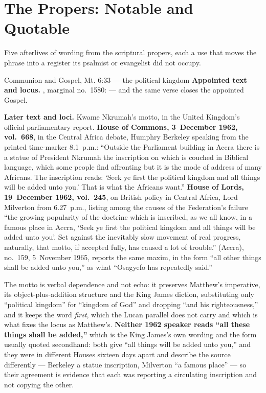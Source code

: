 \sectionguard
\section*{The Propers: Notable and Quotable}

Five afterlives of wording from the scriptural propers, each a use that moves
the phrase into a register its psalmist or evangelist did not occupy.

\begin{afterlife}{Communion and Gospel, Mt. 6:33 --- the political kingdom}
\textbf{Appointed text and locus.} , marginal
no.~1580:  --- and the same verse closes the appointed Gospel.

\textbf{Later text and loci.} Kwame Nkrumah's motto, in the United Kingdom's
official parliamentary report. \textbf{House of Commons, 3~December 1962,
vol.~668}, in the Central Africa debate, Humphry Berkeley speaking from the
printed time-marker 8.1~p.m.: ``Outside the Parliament building in Accra there
is a statue of President Nkrumah the inscription on which is couched in Biblical
language, which some people find affronting but it is the mode of address of
many Africans. The inscription reads: `Seek ye first the political kingdom and
all things will be added unto you.' That is what the Africans want.''
\textbf{House of Lords, 19~December 1962, vol.~245}, on British policy in
Central Africa, Lord Milverton from 6.27~p.m., listing among the causes of the
Federation's failure ``the growing popularity of the doctrine which is
inscribed, as we all know, in a famous place in Accra, `Seek ye first the
political kingdom and all things will be added unto you'. Set against the
inevitably slow movement of real progress, naturally, that motto, if accepted
fully, has caused a lot of trouble.''  (Accra), no.~159,
5~November 1965, reports the same maxim, in the form ``all other things shall be
added unto you,'' as what ``Osagyefo has repeatedly said.''

The motto is verbal dependence and not echo: it preserves Matthew's imperative,
its object-plus-addition structure and the King James diction, substituting only
``political kingdom'' for ``kingdom of God'' and dropping ``and his
righteousness,'' and it keeps the word \emph{first}, which the Lucan parallel
does not carry and which is what fixes the locus as Matthew's.
\textbf{Neither 1962 speaker reads ``all these things shall be added,''} which
is the King James's own wording and the form usually quoted secondhand: both
give ``all things will be added unto you,'' and they were in different Houses
sixteen days apart and describe the source differently --- Berkeley a statue
inscription, Milverton ``a famous place'' --- so their agreement is evidence
that each was reporting a circulating inscription and not copying the other.


\end{afterlife}
